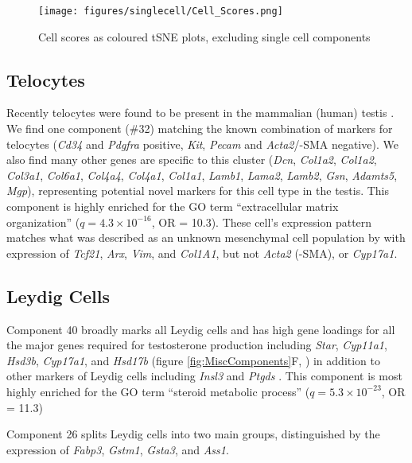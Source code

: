 \begin{figure}[H]
	\centering
	\texttt{[image: figures/singlecell/Cell\_Scores.png]}
	\caption[SDA Cell Scores]{Cell scores as coloured tSNE plots, excluding single cell components}
	\label{fig:Cell_Scores}
\end{figure}




\subsection{Telocytes}
Recently telocytes were found to be present in the mammalian (human) testis \parencite{Marini2018Reappraising, Kuroda2004Distribution}. We find one component (\#32) matching the known combination of markers for telocytes (\textit{Cd34} and \textit{Pdgfra} positive, \textit{Kit}, \textit{Pecam} and \textit{Acta2}/\textalpha-SMA negative). We also find many other genes are specific to this cluster (\textit{Dcn}, \textit{Col1a2}, \textit{Col1a2}, \textit{Col3a1}, \textit{Col6a1}, \textit{Col4a4}, \textit{Col4a1}, \textit{Col1a1}, \textit{Lamb1}, \textit{Lama2}, \textit{Lamb2}, \textit{Gsn}, \textit{Adamts5}, \textit{Mgp}), representing potential novel markers for this cell type in the testis. This component is highly enriched for the GO term ``extracellular matrix organization'' ($q = 4.3\times10^{-16}$, OR = 10.3). These cell's expression pattern matches what was described as an unknown mesenchymal cell population by \cite{Green2018Comprehensive} with expression of \textit{Tcf21}, \textit{Arx}, \textit{Vim}, and \textit{Col1A1}, but not \textit{Acta2} (\textalpha-SMA), or \textit{Cyp17a1}.


\subsection{Leydig Cells}
Component 40 broadly marks all Leydig cells and has high gene loadings for all the major genes required for testosterone production including \textit{Star}, \textit{Cyp11a1}, \textit{Hsd3b}, \textit{Cyp17a1}, and \textit{Hsd17b} (figure \ref{fig:MiscComponents}F, \cite{Stojkov2013Orally}) in addition to other markers of Leydig cells including \textit{Insl3} and \textit{Ptgds} \parencite{Balvers1998RelaxinLike, Baker2001Expression}. This component is most highly enriched for the GO term ``steroid metabolic process'' ($q = 5.3\times10^{-23}$, OR = 11.3)

Component 26 splits Leydig cells into two main groups, distinguished by the expression of \textit{Fabp3}, \textit{Gstm1}, \textit{Gsta3}, and \textit{Ass1}.

